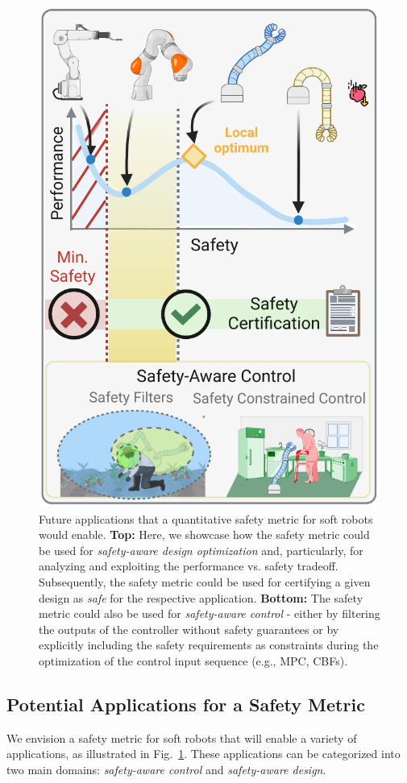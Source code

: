 \begin{figure}
    \centering
    \includegraphics[width=0.5\linewidth]{safetymetric/figures/safety_metric_applications.pdf}
    \caption{Future applications that a quantitative safety metric for soft robots would enable. \textbf{Top:} Here, we showcase how the safety metric could be used for \emph{safety-aware design optimization} and, particularly, for analyzing and exploiting the performance vs. safety tradeoff. Subsequently, the safety metric could be used for certifying a given design as \emph{safe} for the respective application. \textbf{Bottom:} The safety metric could also be used for \emph{safety-aware control} - either by filtering the outputs of the controller without safety guarantees or by explicitly including the safety requirements as constraints during the optimization of the control input sequence (e.g., \gls{MPC}, \glspl{CBF}).}
    \label{fig:safetymetric:safety_metric_applications}
\end{figure}

\subsection{Potential Applications for a Safety Metric}\label{sub:safetymetric:safety_metric_applications}
We envision a safety metric for soft robots that will enable a variety of applications, as illustrated in Fig.~\ref{fig:safetymetric:safety_metric_applications}. These applications can be categorized into two main domains: \emph{safety-aware control} and \emph{safety-aware design}.


